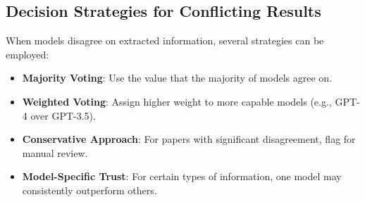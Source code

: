 
\subsection{Decision Strategies for Conflicting Results}

When models disagree on extracted information, several strategies can be employed:

\begin{itemize}
    \item \textbf{Majority Voting}: Use the value that the majority of models agree on.
    \item \textbf{Weighted Voting}: Assign higher weight to more capable models (e.g., GPT-4 over GPT-3.5).
    \item \textbf{Conservative Approach}: For papers with significant disagreement, flag for manual review.
    \item \textbf{Model-Specific Trust}: For certain types of information, one model may consistently outperform others.
\end{itemize}

